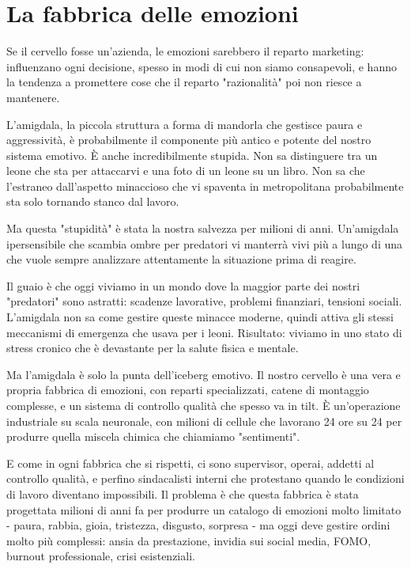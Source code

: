 \chapter{La fabbrica delle emozioni}

Se il cervello fosse un'azienda, le emozioni sarebbero il reparto marketing: influenzano ogni decisione, spesso in modi di cui non siamo consapevoli, e hanno la tendenza a promettere cose che il reparto "razionalità" poi non riesce a mantenere.

L'amigdala, la piccola struttura a forma di mandorla che gestisce paura e aggressività, è probabilmente il componente più antico e potente del nostro sistema emotivo. È anche incredibilmente stupida. Non sa distinguere tra un leone che sta per attaccarvi e una foto di un leone su un libro. Non sa che l'estraneo dall'aspetto minaccioso che vi spaventa in metropolitana probabilmente sta solo tornando stanco dal lavoro.

Ma questa "stupidità" è stata la nostra salvezza per milioni di anni. Un'amigdala ipersensibile che scambia ombre per predatori vi manterrà vivi più a lungo di una che vuole sempre analizzare attentamente la situazione prima di reagire.

Il guaio è che oggi viviamo in un mondo dove la maggior parte dei nostri "predatori" sono astratti: scadenze lavorative, problemi finanziari, tensioni sociali. L'amigdala non sa come gestire queste minacce moderne, quindi attiva gli stessi meccanismi di emergenza che usava per i leoni. Risultato: viviamo in uno stato di stress cronico che è devastante per la salute fisica e mentale.

\bigskip

Ma l'amigdala è solo la punta dell'iceberg emotivo. Il nostro cervello è una vera e propria fabbrica di emozioni, con reparti specializzati, catene di montaggio complesse, e un sistema di controllo qualità che spesso va in tilt. È un'operazione industriale su scala neuronale, con milioni di cellule che lavorano 24 ore su 24 per produrre quella miscela chimica che chiamiamo "sentimenti".

E come in ogni fabbrica che si rispetti, ci sono supervisor, operai, addetti al controllo qualità, e perfino sindacalisti interni che protestano quando le condizioni di lavoro diventano impossibili. Il problema è che questa fabbrica è stata progettata milioni di anni fa per produrre un catalogo di emozioni molto limitato - paura, rabbia, gioia, tristezza, disgusto, sorpresa - ma oggi deve gestire ordini molto più complessi: ansia da prestazione, invidia sui social media, FOMO, burnout professionale, crisi esistenziali.

